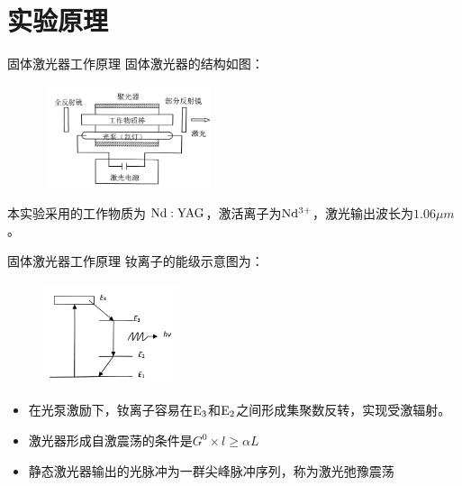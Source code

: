 \documentclass{beamer}
\begin{document}


\section{实验原理}

\begin{frame}{固体激光器工作原理}
固体激光器的结构如图：
\begin{figure}
  \includegraphics[height=3cm,width=5cm]{images/1.jpg}
  \label{fg1}
\end{figure}
本实验采用的工作物质为 \(\rm Nd:YAG\)，激活离子为\(\rm Nd^{3+}\)，激光输出波长为\(1.06\mu m\)。
\end{frame}
\begin{frame}{固体激光器工作原理}
  钕离子的能级示意图为：
  \begin{figure}
    \includegraphics[height=3cm,width=4cm]{images/2.jpg}
    \label{fg2}
  \end{figure}
  \begin{itemize}
    \item 在光泵激励下，钕离子容易在\(\rm E_3\)和\(\rm E_2\)之间形成集聚数反转，实现受激辐射。
    \item 激光器形成自激震荡的条件是\(G^0 \times l \geq \alpha L \)
    \item 静态激光器输出的光脉冲为一群尖峰脉冲序列，称为激光弛豫震荡
  \end{itemize}
  
\end{frame}
\end{document}
